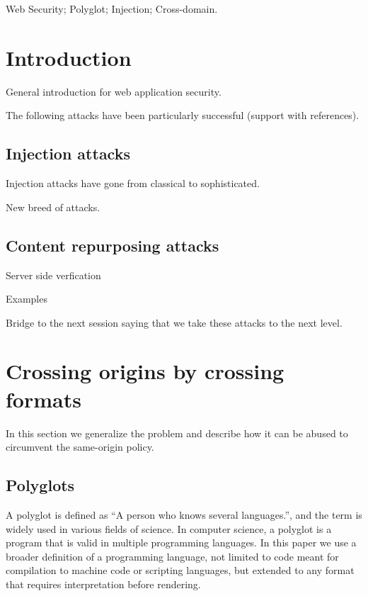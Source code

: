 \documentclass[10pt, conference, compsocconf]{IEEEtran}
\begin{document}
\begin{IEEEkeywords}
Web Security; Polyglot; Injection; Cross-domain.
\end{IEEEkeywords}








\section{Introduction}
\label{sec:intro}

General introduction for web application security.

The following attacks have  been particularly successful (support with references).

\subsection{Injection attacks}

Injection attacks have gone from classical to sophisticated.

New breed of attacks.

\subsection{Content repurposing attacks}

Server side verfication

Examples


Bridge to the next session saying that we take these attacks to the
next level.

\section{Crossing origins by crossing formats}


In this section we generalize the problem and describe 
how it can be abused to circumvent the same-origin policy.


\subsection{Polyglots}


A polyglot is defined as ``A person who knows several languages.'', 
and the term is widely used in various fields of science. In computer 
science, a polyglot is a program that is valid in multiple programming 
languages. In this paper we use a broader definition of a programming language, 
not limited to code meant for compilation to machine code or scripting 
languages, but extended to any format that requires interpretation 
before rendering.
\end{document}
